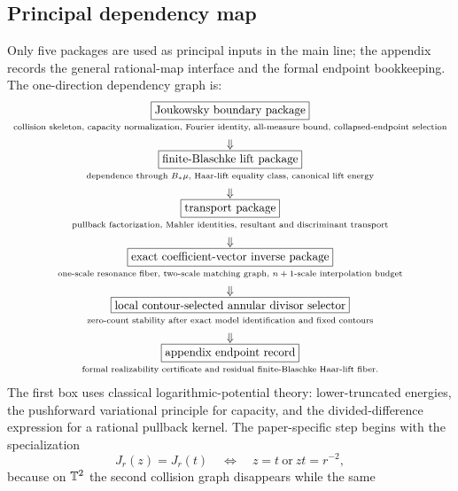 \subsection*{Principal dependency map}
Only five packages are used as principal inputs in the main line; the
appendix records the general rational-map interface and the formal
endpoint bookkeeping.  The one-direction dependency graph is:
\[
\begin{array}{c}
\boxed{\text{Joukowsky boundary package}}\\
\text{\scriptsize collision skeleton, capacity normalization,
Fourier identity, all-measure bound, collapsed-endpoint selection}\\[0.35em]
\Downarrow\\[-0.1em]
\boxed{\text{finite-Blaschke lift package}}\\
\text{\scriptsize dependence through \(B_\ast\mu\), Haar-lift equality
class, canonical lift energy}\\[0.35em]
\Downarrow\\[-0.1em]
\boxed{\text{transport package}}\\
\text{\scriptsize pullback factorization, Mahler identities,
resultant and discriminant transport}\\[0.35em]
\Downarrow\\[-0.1em]
\boxed{\text{exact coefficient-vector inverse package}}\\
\text{\scriptsize one-scale resonance fiber, two-scale matching graph,
\(n+1\)-scale interpolation budget}\\[0.35em]
\Downarrow\\[-0.1em]
\boxed{\text{local contour-selected annular divisor selector}}\\
\text{\scriptsize zero-count stability after exact model identification
and fixed contours}\\[0.35em]
\Downarrow\\[-0.1em]
\boxed{\text{appendix endpoint record}}\\
\text{\scriptsize formal realizability certificate and residual
finite-Blaschke Haar-lift fiber.}
\end{array}
\]
The first box uses classical logarithmic-potential theory: lower-truncated
energies, the pushforward variational principle for capacity, and the
divided-difference expression for a rational pullback kernel.  The
paper-specific step begins with the specialization
\[
J_r(z)=J_r(t)\quad\Longleftrightarrow\quad z=t
\ \text{or}\ zt=r^{-2},
\]
because on \(\mathbb{T}^2\) the second collision graph disappears while the same
